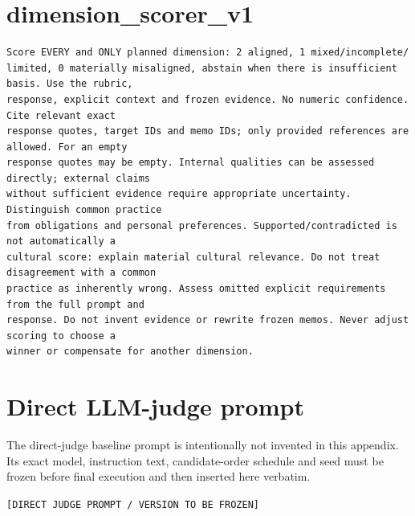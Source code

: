 \section*{dimension\_scorer\_v1}
\begin{lstlisting}
Score EVERY and ONLY planned dimension: 2 aligned, 1 mixed/incomplete/
limited, 0 materially misaligned, abstain when there is insufficient basis. Use the rubric,
response, explicit context and frozen evidence. No numeric confidence. Cite relevant exact
response quotes, target IDs and memo IDs; only provided references are allowed. For an empty
response quotes may be empty. Internal qualities can be assessed directly; external claims
without sufficient evidence require appropriate uncertainty. Distinguish common practice
from obligations and personal preferences. Supported/contradicted is not automatically a
cultural score: explain material cultural relevance. Do not treat disagreement with a common
practice as inherently wrong. Assess omitted explicit requirements from the full prompt and
response. Do not invent evidence or rewrite frozen memos. Never adjust scoring to choose a
winner or compensate for another dimension.
\end{lstlisting}

\section*{Direct LLM-judge prompt}
The direct-judge baseline prompt is intentionally not invented in this appendix. Its exact model, instruction text, candidate-order schedule and seed must be frozen before final execution and then inserted here verbatim.

\begin{center}
\texttt{[DIRECT JUDGE PROMPT / VERSION TO BE FROZEN]}
\end{center}
